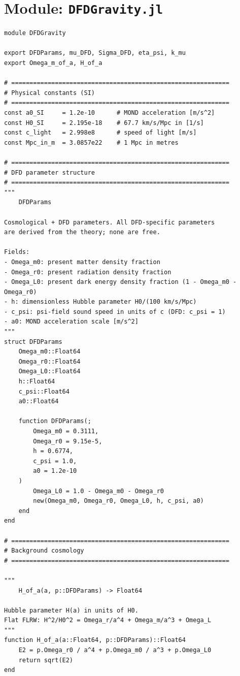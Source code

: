 \documentclass[11pt,a4paper]{article}
\begin{document}
\section{Module: \texttt{DFDGravity.jl}}

\begin{lstlisting}[caption={DFDGravity.jl --- Core $\mu(a,k)$ and $\Sigma(a,k)$ module},label=lst:dfdgravity]
module DFDGravity

export DFDParams, mu_DFD, Sigma_DFD, eta_psi, k_mu
export Omega_m_of_a, H_of_a

# ============================================================
# Physical constants (SI)
# ============================================================
const a0_SI     = 1.2e-10      # MOND acceleration [m/s^2]
const H0_SI     = 2.195e-18    # 67.7 km/s/Mpc in [1/s]
const c_light   = 2.998e8      # speed of light [m/s]
const Mpc_in_m  = 3.0857e22    # 1 Mpc in metres

# ============================================================
# DFD parameter structure
# ============================================================
"""
    DFDParams

Cosmological + DFD parameters. All DFD-specific parameters
are derived from the theory; none are free.

Fields:
- Omega_m0: present matter density fraction
- Omega_r0: present radiation density fraction
- Omega_L0: present dark energy density fraction (1 - Omega_m0 - Omega_r0)
- h: dimensionless Hubble parameter H0/(100 km/s/Mpc)
- c_psi: psi-field sound speed in units of c (DFD: c_psi = 1)
- a0: MOND acceleration scale [m/s^2]
"""
struct DFDParams
    Omega_m0::Float64
    Omega_r0::Float64
    Omega_L0::Float64
    h::Float64
    c_psi::Float64
    a0::Float64

    function DFDParams(;
        Omega_m0 = 0.3111,
        Omega_r0 = 9.15e-5,
        h = 0.6774,
        c_psi = 1.0,
        a0 = 1.2e-10
    )
        Omega_L0 = 1.0 - Omega_m0 - Omega_r0
        new(Omega_m0, Omega_r0, Omega_L0, h, c_psi, a0)
    end
end

# ============================================================
# Background cosmology
# ============================================================

"""
    H_of_a(a, p::DFDParams) -> Float64

Hubble parameter H(a) in units of H0.
Flat FLRW: H^2/H0^2 = Omega_r/a^4 + Omega_m/a^3 + Omega_L
"""
function H_of_a(a::Float64, p::DFDParams)::Float64
    E2 = p.Omega_r0 / a^4 + p.Omega_m0 / a^3 + p.Omega_L0
    return sqrt(E2)
end


\end{lstlisting}
\end{document}
